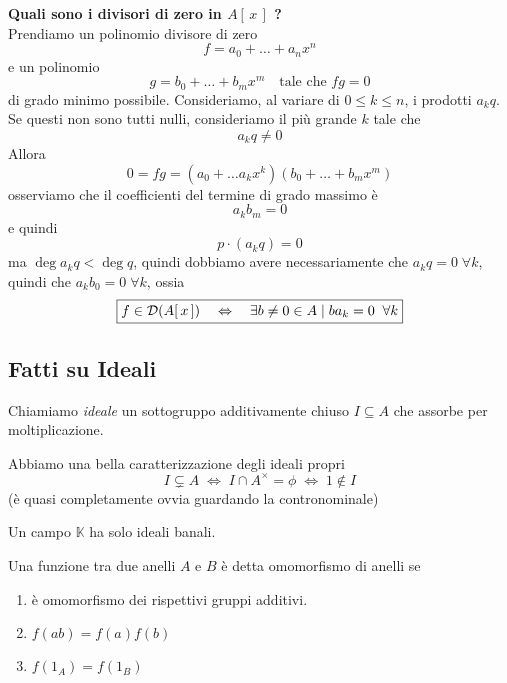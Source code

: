 \begin{multicols}{2}
\textbf{Quali sono i divisori di zero in $ A[\,x\,] $ ?} \\

Prendiamo un polinomio divisore di zero
\[ f = a_0 + \dots + a_nx^n \]
e un polinomio 
\[ g = b_0 + \dots + b_mx^m \quad \text{tale che } fg = 0 \]
di grado minimo possibile.
Consideriamo, al variare di $ 0 \leq k \leq n $, i prodotti
 $ a_k q $.
Se questi non sono tutti nulli, consideriamo il più grande $ k $ tale che \[  a_kq \neq 0 \]
Allora
\[ 0 = fg = (a_0 + \dots a_kx^k) (b_0 + \dots + b_mx^m) \]
osserviamo che il coefficienti del termine di grado massimo è
\[ a_kb_m = 0 \]
e quindi
\[ p \cdot (a_k q) = 0 \]
ma $ \deg{a_k q} < \deg{q} $, quindi dobbiamo avere necessariamente che $ a_kq = 0 \;\forall k $, quindi che $ a_kb_0 = 0 \;\forall k $, ossia
\[ \boxed{f \in \mathcal{D}(A[\,x\,]) \quad\Leftrightarrow\quad \exists b \neq 0 \in A \mid b a_k = 0 \;\;\forall k} \] 


\subsection{Fatti su Ideali}
\begin{definition}[ideale]
	Chiamiamo \emph{ideale} un sottogruppo additivamente chiuso $ I \subseteq A $ che assorbe per moltiplicazione.
\end{definition}

\begin{remark}
	Abbiamo una bella caratterizzazione degli ideali propri
	\[ I \subsetneq A \;\Leftrightarrow\; I \cap A^\times = \phi \;\Leftrightarrow\; 1 \notin I \]
	(è quasi completamente ovvia guardando la contronominale)
\end{remark}


\begin{remark}
	Un campo $ \mathbb{K} $ ha solo ideali banali.
\end{remark}

\begin{definition}[Omomorfismo]
	Una funzione tra due anelli $ A $ e $ B $ è detta omomorfismo di anelli se
	\begin{enumerate}
		\item è omomorfismo dei rispettivi gruppi additivi.
		\item $ f(ab)=f(a)f(b) $
		\item $ f(1_A)=f(1_B) $
	\end{enumerate}
\end{definition}


\end{multicols}
